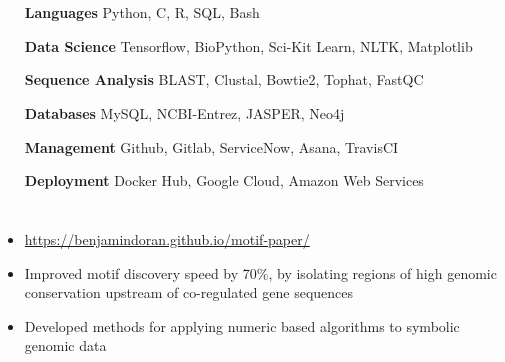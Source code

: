 \documentclass[hidelinks, 10pt]{article}
\begin{document}
\section*{}
\begin{addmargin}{1.7in}
  \begin{itemize}\setlength\itemsep{-4pt}
    \item[{\bf Languages}]{Python, C, R, SQL, Bash}
    \item[{\bf Data Science}]{Tensorflow, BioPython, Sci-Kit Learn, NLTK, Matplotlib }
    \item[{\bf Sequence Analysis}]{BLAST, Clustal, Bowtie2, Tophat, FastQC}
      \item[{\bf Databases}]{MySQL, NCBI-Entrez, JASPER, Neo4j}
      \item[{\bf Management}]{Github, Gitlab, ServiceNow, Asana, TravisCI}
      \item[{\bf Deployment}]{Docker Hub, Google Cloud, Amazon Web Services}
  \end{itemize}
\end{addmargin}
\vspace{6pt}

\section*{}
\begin{addmargin}{.5in}
  \begin{itemize}\setlength\itemsep{-4pt}
    \item{\color{blue}\url{https://benjamindoran.github.io/motif-paper/}}
    \item{Improved motif discovery speed by 70$\%$, by isolating regions of high genomic conservation upstream of co-regulated gene sequences} 
    \item{Developed methods for applying numeric based algorithms to symbolic genomic data}
  \end{itemize}
\end{addmargin}

\end{document}
